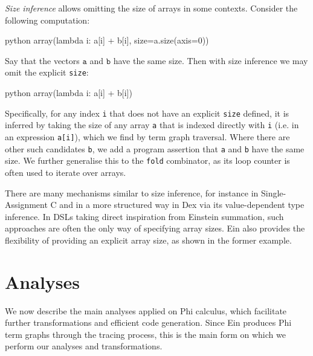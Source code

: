 \textit{Size inference} allows omitting the size of arrays in some contexts. Consider the following computation:
\begin{center} 
\begin{cminted}{python}
array(lambda i: a[i] + b[i], size=a.size(axis=0))
\end{cminted} 
\end{center}
Say that the vectors $\texttt{a}$ and $\texttt{b}$ have the same size. Then with size inference we may omit the explicit \texttt{size}:
\begin{center} 
\begin{cminted}{python}
array(lambda i: a[i] + b[i])
\end{cminted} 
\end{center}
Specifically, for any index \texttt{i} that does not have an explicit \texttt{size} defined, it is inferred by taking the size of any array \texttt{a} that is indexed directly with \texttt{i} (i.e. in an expression \texttt{a[i]}), which we find by term graph traversal. Where there are other such candidates \texttt{b}, we add a program assertion that \texttt{a} and \texttt{b} have the same size. We further generalise this to the \texttt{fold} combinator, as its loop counter is often used to iterate over arrays.


There are many mechanisms similar to size inference, for instance in Single-Assignment C and in a more structured way in Dex via its value-dependent type inference. In DSLs taking direct inspiration from Einstein summation, such approaches are often the only way of specifying array sizes. Ein also provides the flexibility of providing an explicit array size, as shown in the former example.


\section{Analyses}
\label{compiler-analyses}

We now describe the main analyses applied on Phi calculus, which facilitate further transformations and efficient code generation. Since Ein produces Phi term graphs through the tracing process, this is the main form on which we perform our analyses and transformations.


